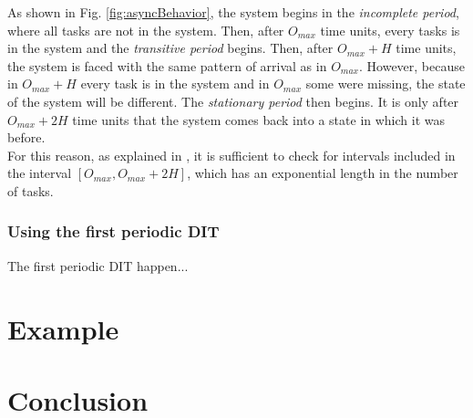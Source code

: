 \documentclass[times, 10pt,twocolumn, a4paper]{article}
\begin{document}
As shown in Fig. \ref{fig:asyncBehavior}, the system begins in the \emph{incomplete period}, where all tasks are not in the system. Then, after $O_{max}$ time units, every tasks is in the system and the \emph{transitive period} begins. Then, after $O_{max} + H$ time units, the system is faced with the same pattern of arrival as in $O_{max}$. However, because in $O_{max} + H$ every task is in the system and in $O_{max}$ some were missing, the state of the system will be different. The \emph{stationary period} then begins. It is only after $O_{max} + 2H$ time units that the system comes back into a state in which it was before.\\

For this reason, as explained in \cite{leung1982complexity}, it is sufficient to check for intervals included in the interval $[O_{max}, O_{max} + 2H]$, which has an exponential length in the number of tasks.

\subsubsection{Using the first periodic DIT}

The first periodic DIT happen...

\section{Example}

\section{Conclusion}



\end{document}
